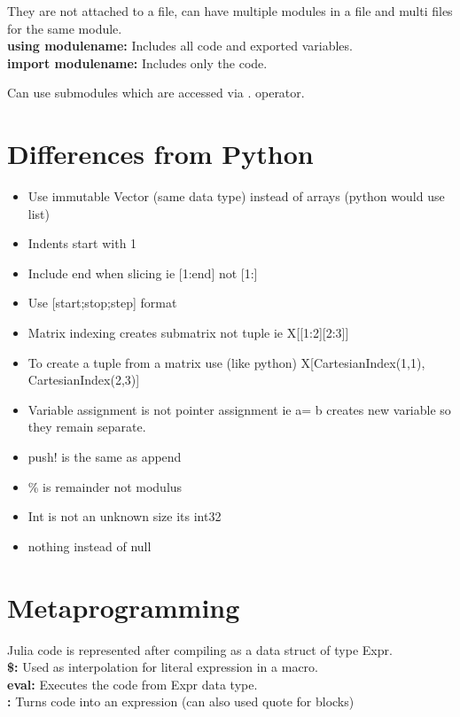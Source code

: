 \documentclass[11pt]{scrartcl} %
\begin{document}
They are not attached to a file, can have multiple modules in a file and multi files for the same module.\\


\textbf{using modulename:} Includes all code and exported variables.\\
\textbf{import modulename:} Includes only the code.

Can use submodules which are accessed via . operator.

\section{Differences from Python}

\begin{itemize}
	\item Use immutable Vector (same data type) instead of arrays (python would use list)
	\item Indents start with 1
	\item Include end when slicing ie [1:end] not [1:]
	\item Use [start;stop;step] format
	\item Matrix indexing creates submatrix not tuple ie X[[1:2][2:3]]
	\item To create a tuple from a matrix use (like python) X[CartesianIndex(1,1), CartesianIndex(2,3)]
	\item Variable assignment is not pointer assignment ie a= b creates new variable so they remain separate.
	\item push! is the same as append
	\item \% is remainder not modulus
	\item Int is not an unknown size its int32
	\item nothing instead of null
\end{itemize}

\newpage
\section{Metaprogramming}

Julia code is represented after compiling as a data struct of type Expr.\\

\textbf{\$:} Used as interpolation for literal expression in a macro.\\
\textbf{eval:} Executes the code from Expr data type.\\
\textbf{:} Turns code into an expression (can also used quote for blocks)
\end{document}
